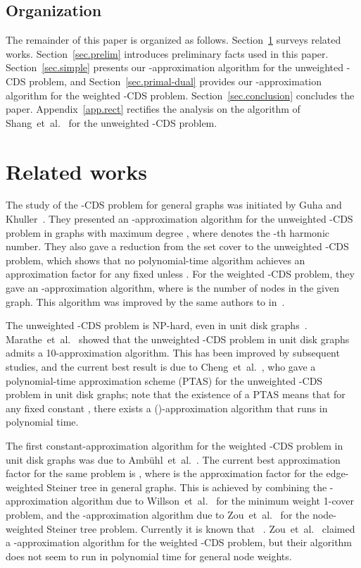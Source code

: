 \documentclass[11pt]{article}
\begin{document}
 \subsection{Organization}

 The remainder of this paper is organized as follows. 
 Section~\ref{sec.relatedworks} surveys related works.
 Section~\ref{sec.prelim} introduces preliminary facts used in this
 paper.
 Section~\ref{sec.simple} presents our -approximation
 algorithm for the unweighted -CDS problem, and
 Section~\ref{sec.primal-dual} provides our -approximation algorithm for the weighted -CDS
 problem. Section~\ref{sec.conclusion} concludes the paper.
 Appendix~\ref{app.rect} rectifies the analysis on the algorithm of Shang~et~al.~\cite{Shang:2007jg}
 for the unweighted -CDS problem.
 
\section{Related works}
\label{sec.relatedworks}

The study of the -CDS problem for general graphs was initiated 
by Guha and Khuller~\cite{GuhaK98}. They presented an
-approximation algorithm for the unweighted -CDS
problem in graphs
with maximum degree ,
where  denotes the -th harmonic number.
They also
gave a reduction from the set cover to the unweighted -CDS problem,
which shows that no polynomial-time algorithm achieves
an approximation factor 
for any fixed  unless
.
For the weighted -CDS problem,
they gave an -approximation
algorithm, where  is the number of nodes in
the given graph.
This algorithm was improved by the same authors to  in~\cite{GuhaK99}.

The unweighted -CDS problem is NP-hard, even in unit disk graphs~\cite{ClarkCJ90}.
 Marathe~et~al.~\cite{MaratheBHRR95}
showed that the unweighted -CDS problem in unit disk graphs admits a 10-approximation algorithm.
This has been improved by subsequent studies, and the current
best result is due to 
Cheng~et~al.~\cite{ChengHLWD03}, who gave a
polynomial-time approximation scheme
(PTAS) for the unweighted
-CDS problem in unit disk graphs; note that the existence of a PTAS means
that for
any fixed constant , there exists a 
()-approximation algorithm that runs in polynomial time.

The first constant-approximation algorithm for
the weighted -CDS problem in unit disk graphs was due to
Amb{\"{u}}hl~et~al.~\cite{AmbuhlEMN06}.
The current best approximation factor
for the same problem
is
, where  is the approximation factor for the
edge-weighted Steiner tree in general graphs.
 This is achieved by
combining the -approximation algorithm
due to Willson~et~al.\ \cite{WillsonZWD15}
for the minimum
weight 1-cover problem, and the -approximation
algorithm due to Zou~et~al.\ \cite{ZouLGW09}
for the node-weighted Steiner tree problem.
Currently it is known that ~\cite{ByrkaGRS13}.
Zou~et~al.\ \cite{ZouWXLDWW11} claimed a -approximation
algorithm for the weighted -CDS problem, but their algorithm does
not seem to run in polynomial time for general node weights.
\end{document}
